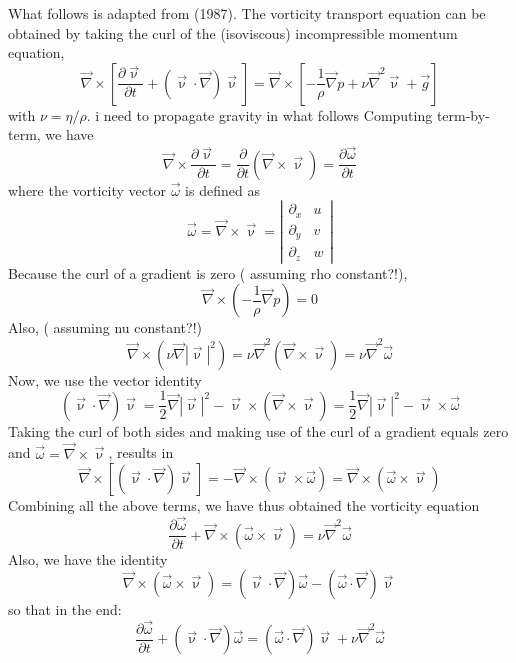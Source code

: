 What follows is adapted from \textcite{glte87} (1987).
The vorticity transport equation can be obtained by taking the curl of the
(isoviscous) incompressible momentum equation,
\begin{equation}
\vec\nabla \times \left[ 
\frac{\partial \vec\upnu}{\partial t} + (\vec\upnu\cdot\vec\nabla) \vec\upnu \right] 
=
\vec\nabla \times \left[ - \frac{1}{\rho}\vec\nabla p +  \nu \vec\nabla^2 \vec\upnu + \vec{g}\right] 
\label{eq:sf01}
\end{equation}
with $\nu = \eta/\rho$.
{\color{orange} i need to propagate gravity in what follows}
Computing term-by-term, we have
\[
\vec\nabla \times 
\frac{\partial \vec\upnu}{\partial t}
=
\frac{\partial }{\partial t} (\vec\nabla \times \vec\upnu) = \frac{\partial \vec\omega}{\partial t}
\]
where the vorticity vector $\vec\omega$ is defined as
\begin{equation}
\vec\omega = \vec\nabla \times \vec\upnu 
=\left|
\begin{array}{cc}
\partial_x & u \\
\partial_y & v \\
\partial_z & w
\end{array}
\right|
\label{eq:sf04}
\end{equation}
Because the curl of a gradient is zero ({\color{orange} assuming rho constant?!}),
\[
\vec\nabla \times \left( - \frac{1}{\rho}\vec\nabla p \right) =0
\]
Also, ({\color{orange} assuming nu constant?!})
\[
\vec\nabla \times ( \nu \vec\nabla |\vec\upnu|^2 ) = \nu \vec\nabla^2 ( \vec\nabla \times \vec\upnu) = \nu  \vec\nabla^2 \vec\omega
\]
Now, we use the vector identity
\begin{equation}
(\vec\upnu\cdot\vec\nabla) \vec\upnu 
= \frac12 \vec\nabla |\vec\upnu|^2 - \vec\upnu \times (\vec\nabla \times \vec\upnu)
= \frac12 \vec\nabla |\vec\upnu|^2 - \vec\upnu \times \vec\omega
\label{eq:sf02}
\end{equation}
Taking the curl of both sides and making use of the curl of a gradient equals zero and $\vec\omega = \vec\nabla \times \vec\upnu$, results in
\[
\vec\nabla \times [ (\vec\upnu \cdot \vec\nabla ) \vec\upnu]
=-\vec\nabla \times (\vec\upnu \times \vec\omega)
=\vec\nabla \times (\vec\omega \times \vec\upnu)
\]
Combining all the above terms, we have thus obtained the vorticity equation 
\begin{equation}
\boxed{
\frac{\partial \vec\omega}{\partial t}
+ \vec\nabla \times  (\vec \omega  \times \vec\upnu) 
=\nu \vec\nabla^2 \vec\omega}
\label{eq:sf03}
\end{equation}
Also, we have the identity
\[
\vec\nabla \times (\vec\omega \times \vec\upnu) 
=
(\vec\upnu\cdot\vec\nabla)\vec\omega-(\vec\omega\cdot\vec\nabla)\vec\upnu
\]
so that in the end:
\begin{equation}
\boxed{
\frac{\partial \vec\omega}{\partial t}
+ (\vec\upnu  \cdot \vec\nabla) \vec\omega
=
(\vec\omega\cdot\vec\nabla ) \vec\upnu + \nu \vec\nabla^2 \vec\omega}
\label{eq:sf03b}
\end{equation}


